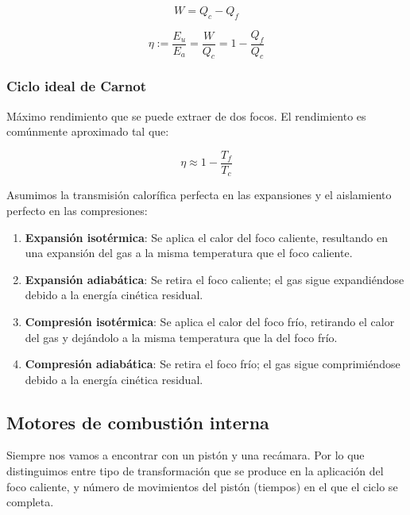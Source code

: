 \documentclass[10pt]{article}
\begin{document}
\[ W = Q_c - Q_f\]

\[ \eta := \frac{E_u}{E_a} = \frac{W}{Q_c} = 1 - \frac{Q_f}{Q_c} \]

\subsubsection{Ciclo ideal de Carnot}

Máximo rendimiento que se puede extraer de dos focos. El rendimiento es comúnmente aproximado tal que:

\[ \eta \approx 1 - \frac{T_f}{T_c} \]

Asumimos la transmisión calorífica perfecta en las expansiones y el aislamiento perfecto en las compresiones:

\begin{enumerate}
    \item \textbf{Expansión isotérmica}: Se aplica el calor del foco caliente, resultando en una expansión del gas a la misma temperatura que el foco caliente.
    \item \textbf{Expansión adiabática}: Se retira el foco caliente; el gas sigue expandiéndose debido a la energía cinética residual.
    \item \textbf{Compresión isotérmica}: Se aplica el calor del foco frío, retirando el calor del gas y dejándolo a la misma temperatura que la del foco frío.
    \item \textbf{Compresión adiabática}: Se retira el foco frío; el gas sigue comprimiéndose debido a la energía cinética residual.
\end{enumerate}

\begin{center}
\end{center}

\subsection{Motores de combustión interna}

Siempre nos vamos a encontrar con un pistón y una recámara. Por lo que distinguimos entre tipo de transformación que se produce en la aplicación del foco caliente, y número de movimientos del pistón (tiempos) en el que el ciclo se completa. 
\end{document}
